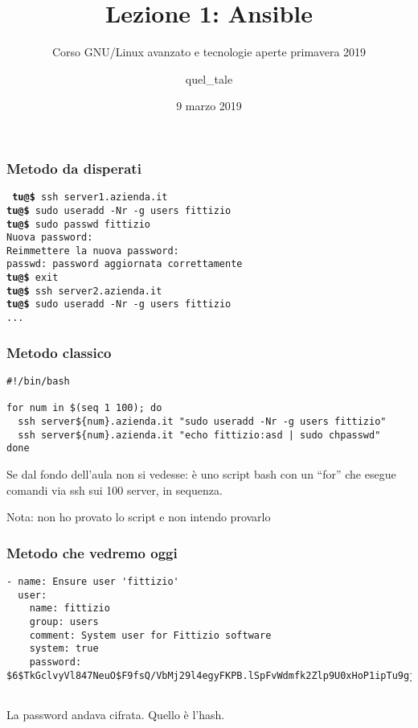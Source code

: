 \documentclass{beamer}
\title[Ansible]{Lezione 1: Ansible}
\subtitle{Corso GNU/Linux avanzato e tecnologie aperte primavera 2019}
\author{quel\_tale}
\institute{WEEE Open}
\date[2019]{9 marzo 2019}
\newcommand{\host}[1]{{\color{blue}{#1}}}
\newcommand{\prompt}[1]{\textbf{#1}}
\begin{document}
	
\frame{\titlepage}

\begin{frame}[fragile]
\frametitle{Metodo da disperati}
\texttt{%
\prompt{tu@\host{tuo-computer}\$} ssh server1.azienda.it\\
\prompt{tu@\host{server1}\$} sudo useradd -Nr -g users fittizio\\
\prompt{tu@\host{server1}\$} sudo passwd fittizio\\
Nuova password: \\
Reimmettere la nuova password: \\
passwd: password aggiornata correttamente\\
\prompt{tu@\host{server1}\$} exit\\
\prompt{tu@\host{tuo-computer}\$} ssh server2.azienda.it\\
\prompt{tu@\host{server2}\$} sudo useradd -Nr -g users fittizio\\
...}
\end{frame}
	
\begin{frame}[fragile]
\frametitle{Metodo classico}
\begin{lstlisting}[basicstyle=\tiny]
#!/bin/bash

for num in $(seq 1 100); do
  ssh server${num}.azienda.it "sudo useradd -Nr -g users fittizio"
  ssh server${num}.azienda.it "echo fittizio:asd | sudo chpasswd"
done

\end{lstlisting}

\vspace{2em}

Se dal fondo dell'aula non si vedesse: è uno script bash con un ``for'' che esegue comandi via ssh sui 100 server, in sequenza.

{\tiny Nota: non ho provato lo script e non intendo provarlo}
\end{frame}

\begin{frame}[fragile]
\frametitle{Metodo che vedremo oggi}
\begin{lstlisting}
- name: Ensure user 'fittizio'
  user:
    name: fittizio
    group: users
    comment: System user for Fittizio software
    system: true
    password: $6$TkGclvyVl847NeuO$F9fsQ/VbMj29l4egyFKPB.lSpFvWdmfk2Zlp9U0xHoP1ipTu9gjoXMRgQkIqb.aIERVR3ecbsPsABuftYIlTY/
    
\end{lstlisting}

{\small La password andava cifrata. Quello è l'hash.}
\end{frame}
\end{document}
